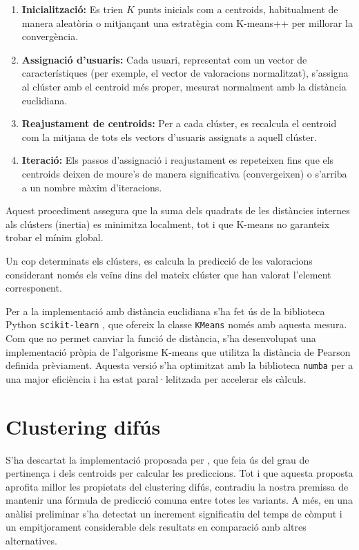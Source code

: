 \documentclass[a4paper,12pt]{report}
\begin{document}
\begin{enumerate}
    \item \textbf{Inicialització:} Es trien $K$ punts inicials com a centroids, habitualment de manera aleatòria o mitjançant una estratègia com K-means++ per millorar la convergència.
    \item \textbf{Assignació d’usuaris:} Cada usuari, representat com un vector de característiques (per exemple, el vector de valoracions normalitzat), s’assigna al clúster amb el centroid més proper, mesurat normalment amb la distància euclidiana.
    \item \textbf{Reajustament de centroids:} Per a cada clúster, es recalcula el centroid com la mitjana de tots els vectors d’usuaris assignats a aquell clúster.
    \item \textbf{Iteració:} Els passos d’assignació i reajustament es repeteixen fins que els centroids deixen de moure’s de manera significativa (convergeixen) o s’arriba a un nombre màxim d’iteracions.
\end{enumerate}

Aquest procediment assegura que la suma dels quadrats de les distàncies internes als clústers (inertia) es minimitza localment, tot i que K-means no garanteix trobar el mínim global.

Un cop determinats els clústers, es calcula la predicció de les valoracions considerant només els veïns dins del mateix clúster que han valorat l’element corresponent.

Per a la implementació amb distància euclidiana s'ha fet ús de la biblioteca Python \texttt{scikit-learn} \cite{pedregosa2011scikit}, que ofereix la classe \texttt{KMeans} només amb aquesta mesura. Com que no permet canviar la funció de distància, s'ha desenvolupat una implementació pròpia de l'algorisme K-means que utilitza la distància de Pearson definida prèviament. Aquesta versió s'ha optimitzat amb la biblioteca \texttt{numba} per a una major eficiència i ha estat paral·lelitzada per accelerar els càlculs.


\section{Clustering difús}

S’ha descartat la implementació proposada per \cite{treerattanapitak2009items}, que feia ús del grau de pertinença i dels centroids per calcular les prediccions. Tot i que aquesta proposta aprofita millor les propietats del clustering difús, contradiu la nostra premissa de mantenir una fórmula de predicció comuna entre totes les variants. A més, en una anàlisi preliminar s’ha detectat un increment significatiu del temps de còmput i un empitjorament considerable dels resultats en comparació amb altres alternatives.
\end{document}
